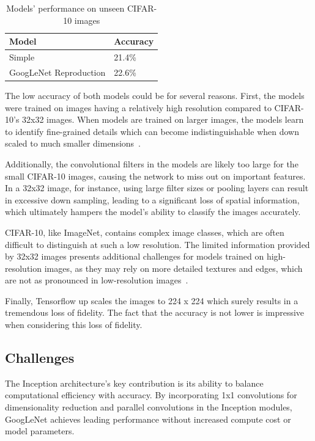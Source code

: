 \documentclass{article}
\begin{document}
\begin{table}[ht]
    \centering
    \begin{tabular}{ll}
    \hline
    \textbf{Model} & \textbf{Accuracy} \\ \hline
    Simple & 21.4\% \\ \hline
    GoogLeNet Reproduction & 22.6\% \\ \hline
    \end{tabular}
    \caption{Models' performance on unseen CIFAR-10 images}
    \label{tab:perf-cifar10}
\end{table}

The low accuracy of both models could be for several reasons. First, the models were trained on images having a relatively high resolution compared to CIFAR-10's 32x32 images. When models are trained on larger images, the models learn to identify fine-grained details which can become indistinguishable when down scaled to much smaller dimensions~\cite{simonyan2015vgg}.

Additionally, the convolutional filters in the models are likely too large for the small CIFAR-10 images, causing the network to miss out on important features. In a 32x32 image, for instance, using large filter sizes or pooling layers can result in excessive down sampling, leading to a significant loss of spatial information, which ultimately hampers the model's ability to classify the images accurately.

CIFAR-10, like ImageNet, contains complex image classes, which are often difficult to distinguish at such a low resolution. The limited information provided by 32x32 images presents additional challenges for models trained on high-resolution images, as they may rely on more detailed textures and edges, which are not as pronounced in low-resolution images~\cite{krizhevsky2012imagenet}.

Finally, Tensorflow up scales the images to 224 x 224 which surely results in a tremendous loss of fidelity. The fact that the accuracy is not lower is impressive when considering this loss of fidelity.


\subsection{Challenges}
The Inception architecture's key contribution is its ability to balance computational efficiency with accuracy. By incorporating 1x1 convolutions for dimensionality reduction and parallel convolutions in the Inception modules, GoogLeNet achieves leading performance without increased compute cost or model parameters.
\end{document}
